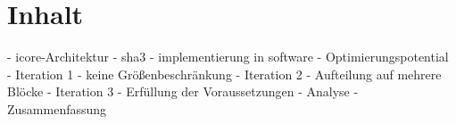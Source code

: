 \section{Inhalt}

- icore-Architektur
- sha3
- implementierung in software
- Optimierungspotential
- Iteration 1 - keine Größenbeschränkung
- Iteration 2 - Aufteilung auf mehrere Blöcke
- Iteration 3 - Erfüllung der Voraussetzungen
- Analyse
- Zusammenfassung
